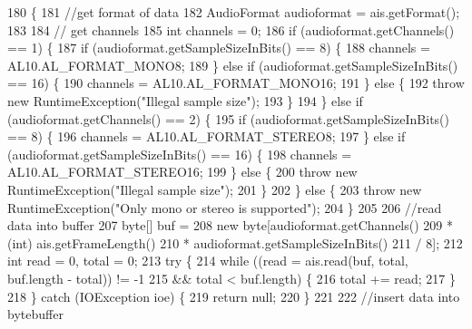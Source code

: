 \begin{DoxyCode}
180                                                         \{
181         \textcolor{comment}{//get format of data}
182         AudioFormat audioformat = ais.getFormat();
183 
184         \textcolor{comment}{// get channels}
185         \textcolor{keywordtype}{int} channels = 0;
186         \textcolor{keywordflow}{if} (audioformat.getChannels() == 1) \{
187             \textcolor{keywordflow}{if} (audioformat.getSampleSizeInBits() == 8) \{
188                 channels = AL10.AL\_FORMAT\_MONO8;
189             \} \textcolor{keywordflow}{else} \textcolor{keywordflow}{if} (audioformat.getSampleSizeInBits() == 16) \{
190                 channels = AL10.AL\_FORMAT\_MONO16;
191             \} \textcolor{keywordflow}{else} \{
192                 \textcolor{keywordflow}{throw} \textcolor{keyword}{new} RuntimeException(\textcolor{stringliteral}{"Illegal sample size"});
193             \}
194         \} \textcolor{keywordflow}{else} \textcolor{keywordflow}{if} (audioformat.getChannels() == 2) \{
195             \textcolor{keywordflow}{if} (audioformat.getSampleSizeInBits() == 8) \{
196                 channels = AL10.AL\_FORMAT\_STEREO8;
197             \} \textcolor{keywordflow}{else} \textcolor{keywordflow}{if} (audioformat.getSampleSizeInBits() == 16) \{
198                 channels = AL10.AL\_FORMAT\_STEREO16;
199             \} \textcolor{keywordflow}{else} \{
200                 \textcolor{keywordflow}{throw} \textcolor{keyword}{new} RuntimeException(\textcolor{stringliteral}{"Illegal sample size"});
201             \}
202         \} \textcolor{keywordflow}{else} \{
203             \textcolor{keywordflow}{throw} \textcolor{keyword}{new} RuntimeException(\textcolor{stringliteral}{"Only mono or stereo is supported"});
204         \}
205 
206         \textcolor{comment}{//read data into buffer}
207         byte[] buf =
208             \textcolor{keyword}{new} byte[audioformat.getChannels()
209                 * (int) ais.getFrameLength()
210                 * audioformat.getSampleSizeInBits()
211                 / 8];
212         \textcolor{keywordtype}{int} read = 0, total = 0;
213         \textcolor{keywordflow}{try} \{
214             \textcolor{keywordflow}{while} ((read = ais.read(buf, total, buf.length - total)) != -1
215                 && total < buf.length) \{
216                 total += read;
217             \}
218         \} \textcolor{keywordflow}{catch} (IOException ioe) \{
219             \textcolor{keywordflow}{return} null;
220         \}
221 
222         \textcolor{comment}{//insert data into bytebuffer}

\end{DoxyCode}
